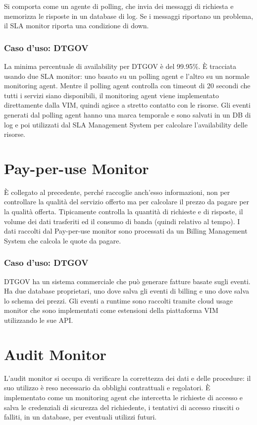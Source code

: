 Si comporta come un agente di polling, che invia dei messaggi di richiesta e memorizza le risposte in un database di log. Se i messaggi riportano un problema, il SLA monitor riporta una condizione di down.

\subsubsection{\textbf{Caso d'uso: DTGOV}}
La minima percentuale di availability per DTGOV è del 99.95\%. È tracciata usando due SLA monitor: uno basato su un polling agent e l'altro su un normale monitoring agent. Mentre il polling agent controlla con timeout di 20 secondi che tutti i servizi siano disponibili, il monitoring agent viene implementato direttamente dalla VIM, quindi agisce a stretto contatto con le risorse. Gli eventi generati dal polling agent hanno una marca temporale e sono salvati in un DB di log e poi utilizzati dal SLA Management System per calcolare l'availability delle risorse.

\section{Pay-per-use Monitor}
È collegato al precedente, perché raccoglie anch'esso informazioni, non per controllare la qualità del servizio offerto ma per calcolare il prezzo da pagare per la qualità offerta. Tipicamente controlla la quantità di richieste e di risposte, il volume dei dati trasferiti ed il consumo di banda (quindi relativo al tempo). I dati raccolti dal Pay-per-use monitor sono processati da un Billing Management System che calcola le quote da pagare.

\subsubsection{\textbf{Caso d'uso: DTGOV}}
DTGOV ha un sistema commerciale che può generare fatture basate sugli eventi. Ha due database proprietari, uno dove salva gli eventi di billing e uno dove salva lo schema dei prezzi. Gli eventi a runtime sono raccolti tramite cloud usage monitor che sono implementati come estensioni della piattaforma VIM utilizzando le sue API.

\section{Audit Monitor}
L'audit monitor si occupa di verificare la correttezza dei dati e delle procedure: il suo utilizzo è reso necessario da obblighi contrattuali e regolatori. È implementato come un monitoring agent che intercetta le richieste di accesso e salva le credenziali di sicurezza del richiedente, i tentativi di accesso riusciti o falliti, in un database, per eventuali utilizzi futuri.


